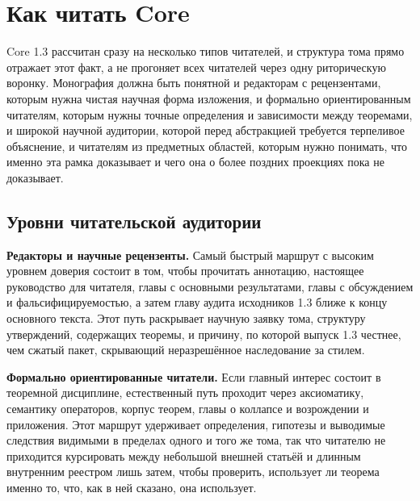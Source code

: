 \section{Как читать Core}

Core 1.3 рассчитан сразу на несколько типов читателей, и структура тома прямо отражает этот факт, а не прогоняет всех читателей через одну риторическую воронку.
Монография должна быть понятной и редакторам с рецензентами, которым нужна чистая научная форма изложения, и формально ориентированным читателям, которым нужны точные определения и зависимости между теоремами, и широкой научной аудитории, которой перед абстракцией требуется терпеливое объяснение, и читателям из предметных областей, которым нужно понимать, что именно эта рамка доказывает и чего она о более поздних проекциях пока не доказывает.

\subsection{Уровни читательской аудитории}

\textbf{Редакторы и научные рецензенты.}
Самый быстрый маршрут с высоким уровнем доверия состоит в том, чтобы прочитать аннотацию, настоящее руководство для читателя, главы с основными результатами, главы с обсуждением и фальсифицируемостью, а затем главу аудита исходников 1.3 ближе к концу основного текста. Этот путь раскрывает научную заявку тома, структуру утверждений, содержащих теоремы, и причину, по которой выпуск 1.3 честнее, чем сжатый пакет, скрывающий неразрешённое наследование за стилем.

\textbf{Формально ориентированные читатели.}
Если главный интерес состоит в теоремной дисциплине, естественный путь проходит через аксиоматику, семантику операторов, корпус теорем, главы о коллапсе и возрождении и приложения. Этот маршрут удерживает определения, гипотезы и выводимые следствия видимыми в пределах одного и того же тома, так что читателю не приходится курсировать между небольшой внешней статьёй и длинным внутренним реестром лишь затем, чтобы проверить, использует ли теорема именно то, что, как в ней сказано, она использует.

